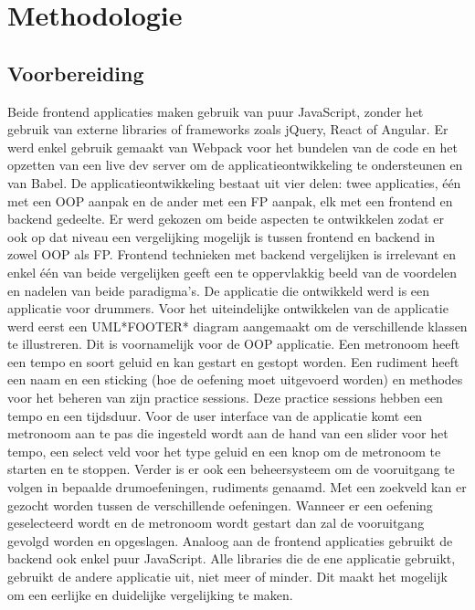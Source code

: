 
\chapter{Methodologie}
\label{ch:methodologie}


\section{Voorbereiding}
 Beide frontend applicaties maken gebruik van puur JavaScript, zonder het gebruik van externe libraries of frameworks zoals jQuery, React of Angular. Er werd enkel gebruik gemaakt van Webpack voor het bundelen van de code en het opzetten van een live dev server om de applicatieontwikkeling te ondersteunen en van Babel. De applicatieontwikkeling bestaat uit vier delen: twee applicaties, één met een OOP aanpak en de ander met een FP aanpak, elk met een frontend en backend gedeelte. Er werd gekozen om beide aspecten te ontwikkelen zodat er ook op dat niveau een vergelijking mogelijk is tussen frontend en backend in zowel OOP als FP. Frontend technieken met backend vergelijken is irrelevant en enkel één van beide vergelijken geeft een te oppervlakkig beeld van de voordelen en nadelen van beide paradigma's. De applicatie die ontwikkeld werd is een applicatie voor drummers. Voor het uiteindelijke ontwikkelen van de applicatie werd eerst een UML*FOOTER* diagram aangemaakt om de verschillende klassen te illustreren. Dit is voornamelijk voor de OOP applicatie. Een metronoom heeft een tempo en soort geluid en kan gestart en gestopt worden. Een rudiment heeft een naam en een sticking (hoe de oefening moet uitgevoerd worden) en methodes voor het beheren van zijn practice sessions. Deze practice sessions hebben een tempo en een tijdsduur. Voor de user interface van de applicatie komt een metronoom aan te pas die ingesteld wordt aan de hand van een slider voor het tempo, een select veld voor het type geluid en een knop om de metronoom te starten en te stoppen. Verder is er ook een beheersysteem om de vooruitgang te volgen in bepaalde drumoefeningen, rudiments genaamd. Met een zoekveld kan er gezocht worden tussen de verschillende oefeningen. Wanneer er een oefening geselecteerd wordt en de metronoom wordt gestart dan zal de vooruitgang gevolgd worden en opgeslagen.
 Analoog aan de frontend applicaties gebruikt de backend ook enkel puur JavaScript. Alle libraries die de ene applicatie gebruikt, gebruikt de andere applicatie uit, niet meer of minder. Dit maakt het mogelijk om een eerlijke en duidelijke vergelijking te maken. 


